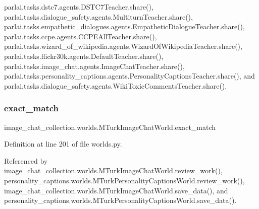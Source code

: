 parlai.\+tasks.\+dstc7.\+agents.\+D\+S\+T\+C7\+Teacher.\+share(), parlai.\+tasks.\+dialogue\+\_\+safety.\+agents.\+Multiturn\+Teacher.\+share(), parlai.\+tasks.\+empathetic\+\_\+dialogues.\+agents.\+Empathetic\+Dialogue\+Teacher.\+share(), parlai.\+tasks.\+ccpe.\+agents.\+C\+C\+P\+E\+All\+Teacher.\+share(), parlai.\+tasks.\+wizard\+\_\+of\+\_\+wikipedia.\+agents.\+Wizard\+Of\+Wikipedia\+Teacher.\+share(), parlai.\+tasks.\+flickr30k.\+agents.\+Default\+Teacher.\+share(), parlai.\+tasks.\+image\+\_\+chat.\+agents.\+Image\+Chat\+Teacher.\+share(), parlai.\+tasks.\+personality\+\_\+captions.\+agents.\+Personality\+Captions\+Teacher.\+share(), and parlai.\+tasks.\+dialogue\+\_\+safety.\+agents.\+Wiki\+Toxic\+Comments\+Teacher.\+share().

\mbox{\label{classimage__chat__collection_1_1worlds_1_1MTurkImageChatWorld_aebd5761b4adf46ed785462d375c8b762}} 
\subsubsection{\texorpdfstring{exact\+\_\+match}{exact\_match}}
{\footnotesize\ttfamily image\+\_\+chat\+\_\+collection.\+worlds.\+M\+Turk\+Image\+Chat\+World.\+exact\+\_\+match}



Definition at line 201 of file worlds.\+py.



Referenced by image\+\_\+chat\+\_\+collection.\+worlds.\+M\+Turk\+Image\+Chat\+World.\+review\+\_\+work(), personality\+\_\+captions.\+worlds.\+M\+Turk\+Personality\+Captions\+World.\+review\+\_\+work(), image\+\_\+chat\+\_\+collection.\+worlds.\+M\+Turk\+Image\+Chat\+World.\+save\+\_\+data(), and personality\+\_\+captions.\+worlds.\+M\+Turk\+Personality\+Captions\+World.\+save\+\_\+data().

\mbox{\label{classimage__chat__collection_1_1worlds_1_1MTurkImageChatWorld_ab9245c8e27f66da8d8dc91591a428433}} 
